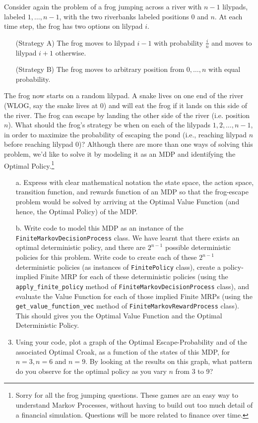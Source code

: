 \documentclass[12pt]{exam}
\begin{document}
\begin{questions}
\question Consider again the problem of a frog jumping across a river with $n-1$ lilypads, labeled $1, \dots, n-1$, with the two riverbanks labeled positions $0$ and $n$. At each time step, the frog has two options on lilypad $i$. 
\begin{enumerate}
	\item [(Strategy A)] The frog moves to lilypad $i-1$  with probability $\frac{i}{n}$ and moves to lilypad $i+1$ otherwise.
	\item [(Strategy B)] The frog moves to arbitrary position from $0,\dots,n$ with equal probability.
\end{enumerate}

The frog now starts on a random lilypad. A snake lives on one end of the river (WLOG, say the snake lives at 0) and will eat the frog if it lands on this side of the river. The frog can escape by landing the other side of the river (i.e. position $n$). What should the frog's strategy be when on each of the lilypads $1, 2, \ldots, n-1$, in order to maximize the probability of escaping the pond (i.e., reaching lilypad $n$ before reaching lilypad $0$)? Although there are more than one ways of solving this problem, we'd like to solve it by modeling it as an MDP and identifying the Optimal Policy.\footnote{Sorry for all the frog jumping questions. These games are an easy way to understand Markov Processes, without having to build out too much detail of a financial simulation. Questions will be more related to finance over time.}

\begin{enumerate}
	\item[a.] Express with clear mathematical notation the state space, the action space, transition function, and rewards function of an MDP so that the frog-escape problem would be solved by arriving at the Optimal Value Function (and hence, the Optimal Policy) of the MDP.
	\item[b.] Write code to model this MDP as an instance of the \lstinline{FiniteMarkovDecisionProcess} class. We have learnt that there exists an optimal deterministic policy, and there are $2^{n-1}$ possible deterministic policies for this problem. Write code to create each of these $2^{n-1}$ deterministic policies (as instances of \lstinline{FinitePolicy} class), create a policy-implied Finite MRP for each of these deterministic policies (using the \lstinline{apply_finite_policy} method of \lstinline{FiniteMarkovDecisionProcess} class), and evaluate the Value Function for each of those implied Finite MRPs (using the \lstinline{get_value_function_vec} method of \lstinline{FiniteMarkovRewardProcess} class). This should gives you the Optimal Value Function and the Optimal Deterministic Policy.
	\item[c.] Using your code, plot a graph of the Optimal Escape-Probability and of the associated Optimal Croak, as a function of the states of this MDP, for $n=3, n=6$ and $n=9$. By looking at the results on this graph, what pattern do you observe for the optimal policy as you vary $n$ from 3 to 9? 
\end{enumerate}

\end{questions}
\end{document}
